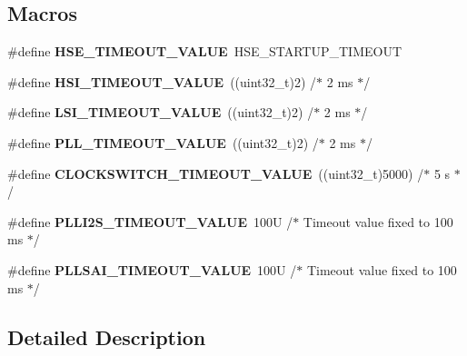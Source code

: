 \subsection*{Macros}
\begin{DoxyCompactItemize}
\item 
\mbox{\label{group___r_c_c___private___constants_gac0cd4ed24fa948844e1a40b12c450f32}} 
\#define {\bfseries H\+S\+E\+\_\+\+T\+I\+M\+E\+O\+U\+T\+\_\+\+V\+A\+L\+UE}~H\+S\+E\+\_\+\+S\+T\+A\+R\+T\+U\+P\+\_\+\+T\+I\+M\+E\+O\+UT
\item 
\mbox{\label{group___r_c_c___private___constants_gad9e56670dcbbe9dbc3a8971b36bbec58}} 
\#define {\bfseries H\+S\+I\+\_\+\+T\+I\+M\+E\+O\+U\+T\+\_\+\+V\+A\+L\+UE}~((uint32\+\_\+t)2)    /$\ast$ 2 ms $\ast$/
\item 
\mbox{\label{group___r_c_c___private___constants_gad52c7f624c88b0c82ab41b9dbd2b347f}} 
\#define {\bfseries L\+S\+I\+\_\+\+T\+I\+M\+E\+O\+U\+T\+\_\+\+V\+A\+L\+UE}~((uint32\+\_\+t)2)    /$\ast$ 2 ms $\ast$/
\item 
\mbox{\label{group___r_c_c___private___constants_gad54d8ad9b3511329efee38b3ad0665de}} 
\#define {\bfseries P\+L\+L\+\_\+\+T\+I\+M\+E\+O\+U\+T\+\_\+\+V\+A\+L\+UE}~((uint32\+\_\+t)2)    /$\ast$ 2 ms $\ast$/
\item 
\mbox{\label{group___r_c_c___private___constants_gab3caadc0f23d394d1033aba55d31fcdc}} 
\#define {\bfseries C\+L\+O\+C\+K\+S\+W\+I\+T\+C\+H\+\_\+\+T\+I\+M\+E\+O\+U\+T\+\_\+\+V\+A\+L\+UE}~((uint32\+\_\+t)5000) /$\ast$ 5 s $\ast$/
\item 
\mbox{\label{group___r_c_c___private___constants_ga50ad77d63441cb945dd630964285cc07}} 
\#define {\bfseries P\+L\+L\+I2\+S\+\_\+\+T\+I\+M\+E\+O\+U\+T\+\_\+\+V\+A\+L\+UE}~100\+U             /$\ast$ Timeout value fixed to 100 ms $\ast$/
\item 
\mbox{\label{group___r_c_c___private___constants_gaa798e797ccefa001aff2218b06b6e448}} 
\#define {\bfseries P\+L\+L\+S\+A\+I\+\_\+\+T\+I\+M\+E\+O\+U\+T\+\_\+\+V\+A\+L\+UE}~100\+U             /$\ast$ Timeout value fixed to 100 ms $\ast$/
\end{DoxyCompactItemize}


\subsection{Detailed Description}
